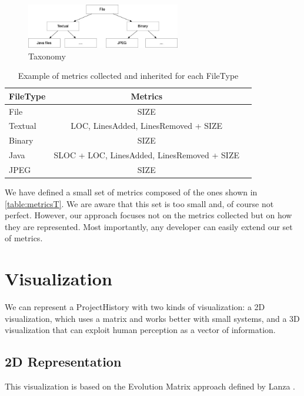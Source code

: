 \begin{figure}
    \centering
    \includegraphics[width=0.6\textwidth]{Taxonomy.jpg}
    \caption{Taxonomy}
    \label{fig:taxonomy}
\end{figure}

\begin{table}[ht]
    \centering
    \begin{tabular}{lcr} \hline
        {\bf FileType} & {\bf Metrics}\\ \hline
        File    & SIZE      \\
        Textual & LOC, LinesAdded, LinesRemoved + SIZE \\
        Binary  & SIZE         \\
        Java    & SLOC + LOC, LinesAdded, LinesRemoved + SIZE \\
        JPEG    & SIZE \\
    \end{tabular}
    \caption{Example of metrics collected and inherited for each FileType}
    \label{table:metricsT}
\end{table}

We have defined a small set of metrics composed of the ones shown in \autoref{table:metricsT}. We are aware that this set is too small and, of course not perfect. However, our approach focuses not on the metrics collected but on how they are represented. Most importantly, any developer can easily extend our set of metrics.


\section{Visualization}
We can represent a ProjectHistory with two kinds of visualization: a 2D visualization, which uses a matrix and works better with small systems, and a 3D visualization that can exploit human perception as a vector of information. 


\subsection{2D Representation}
This visualization is based on the Evolution Matrix approach defined by Lanza \cite{Lanza2001}. 

